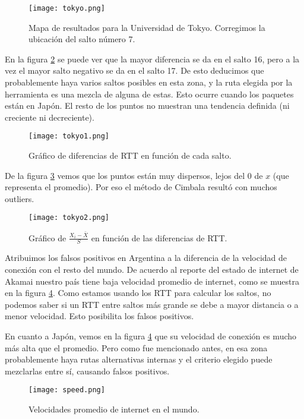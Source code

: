 \begin{figure}[H]
\texttt{[image: tokyo.png]}
\caption{Mapa de resultados para la Universidad de Tokyo. Corregimos la ubicación del salto número 7.}
\label{mapa1}
\end{figure}

En la figura \ref{diff1} se puede ver que la mayor diferencia se da en el salto 16, pero a la vez el mayor salto negativo se da en el salto 17. De esto deducimos que probablemente haya varios saltos posibles en esta zona, y la ruta elegida por la herramienta es una mezcla de alguna de estas. Esto ocurre cuando los paquetes están en Japón. El resto de los puntos no muestran una tendencia definida (ni creciente ni decreciente).

\begin{figure}[H]
\centering
\texttt{[image: tokyo1.png]}
\caption{Gráfico de diferencias de RTT en función de cada salto.}
\label{diff1}
\end{figure}

De la figura \ref{sdev1} vemos que los puntos están muy dispersos, lejos del 0 de $x$ (que representa el promedio). Por eso el método de Cimbala resultó con muchos outliers.

\begin{figure}[H]
\centering
\texttt{[image: tokyo2.png]}
\caption{Gráfico de $\frac{X_i - \bar{X}}{S}$ en función de las diferencias de RTT.}
\label{sdev1}
\end{figure}

Atribuimos los falsos positivos en Argentina a la diferencia de la velocidad de conexión con el resto del mundo. De acuerdo al reporte del estado de internet de Akamai \cite{akamai} nuestro país tiene baja velocidad promedio de internet, como se muestra en la figura \ref{speed}. Como estamos usando los RTT para calcular los saltos, no podemos saber si un RTT entre saltos más grande se debe a mayor distancia o a menor velocidad. Esto posibilita los falsos positivos.

En cuanto a Japón, vemos en la figura \ref{speed} que su velocidad de conexión es mucho más alta que el promedio. Pero como fue mencionado antes, en esa zona probablemente haya rutas alternativas internas y el criterio elegido puede mezclarlas entre sí, causando falsos positivos.

\begin{figure}[H]
\centering
\texttt{[image: speed.png]}
\caption{Velocidades promedio de internet en el mundo.}
\label{speed}
\end{figure}

